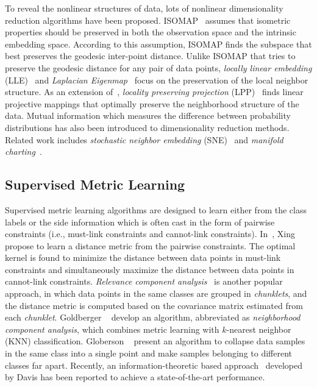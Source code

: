 To reveal the nonlinear structures of data, lots of nonlinear dimensionality reduction algorithms have been proposed. \mbox{ISOMAP}~\cite{tenenbaum2000science} assumes that isometric properties should be preserved in both the observation space and the intrinsic embedding space. According to this assumption, \mbox{ISOMAP} finds the subspace that best preserves the geodesic inter-point distance. Unlike \mbox{ISOMAP} that tries to preserve the geodesic distance for any pair of data points, \textit{locally linear embedding} (\mbox{LLE})~\cite{Roweis2000science} and \textit{Laplacian Eigenmap}~\cite{belkin2003nc} focus on the preservation of the local neighbor structure. As an extension of~\cite{belkin2003nc}, \textit{locality preserving projection} (\mbox{LPP})~\cite{he2003nips} finds linear projective mappings that optimally preserve the neighborhood structure of the data. Mutual information which measures the difference between probability distributions has also been introduced to dimensionality reduction methods. Related work includes \textit{stochastic neighbor embedding} (\mbox{SNE})~\cite{hinton2002nips} and \textit{manifold charting}~\cite{brand2002nips}.

\subsection{Supervised Metric Learning}
Supervised metric learning algorithms are designed to learn either from the class labels or the side information which is often cast in the form of pairwise constraints (i.e., must-link constraints and cannot-link constraints). In~\cite{xing2002nips}, Xing \etal propose to learn a distance metric from the pairwise constraints. The optimal kernel is found to minimize the distance between data points in must-link constraints and simultaneously maximize the distance between data points in cannot-link constraints. \textit{Relevance component analysis}~\cite{shental2002eccv} is another popular approach, in which data points in the same classes are grouped in \textit{chunklets}, and the distance metric is computed based on the covariance matrix estimated from each \textit{chunklet}. Goldberger \etal~\cite{goldberger2004nips} develop an algorithm, abbreviated as \textit{neighborhood component analysis}, which combines metric learning with $k$-nearest neighbor (KNN) classification. Globerson \etal~\cite{globerson2005nips} present an algorithm to collapse data samples in the same class into a single point and make samples belonging to different classes far apart. Recently, an information-theoretic based approach~\cite{davis2007icml} developed by Davis \etal has been reported to achieve a state-of-the-art performance.

